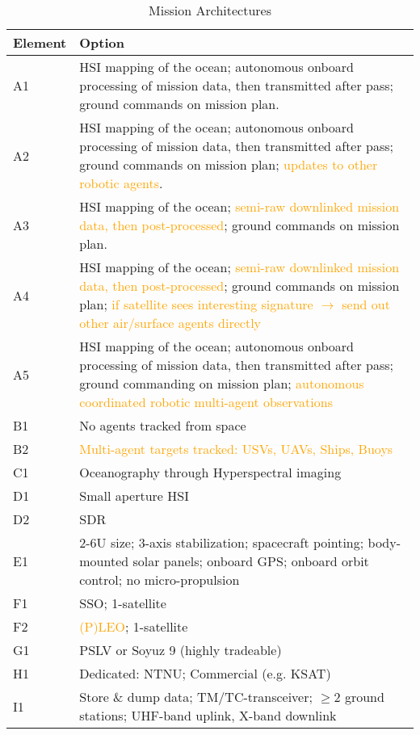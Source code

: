 \begin{table}[htbp]
	\caption{Mission Architectures}
	\label{tab:mission_elem_opts}
	\centering
		\begin{tabular}{|p{0.8cm}|p{7cm}|}
			\hline
		\textbf{Element}		&		\textbf{Option}			\\ 
			\hline 															  
			A1 &  HSI mapping of the ocean; autonomous onboard processing of mission data, then transmitted after pass; ground commands on mission plan.  \\
			\hline
			A2 & HSI mapping of the ocean; autonomous onboard processing of mission data, then transmitted after pass; ground commands on mission plan; \textcolor{orange}{updates to other robotic agents}. \\
			\hline
			A3  & HSI mapping of the ocean; \textcolor{orange}{semi-raw downlinked mission data, then post-processed}; ground commands on mission plan.  \\
			\hline
			A4  & HSI mapping of the ocean; \textcolor{orange}{semi-raw downlinked mission data, then post-processed}; ground commands on mission plan; \textcolor{orange}{if satellite sees interesting signature $\rightarrow$ send out other air/surface agents directly}  \\
			\hline	
			A5  & HSI mapping of the ocean; autonomous onboard processing of mission data, then transmitted after pass; ground commanding on mission plan; \textcolor{orange}{autonomous coordinated robotic multi-agent observations}   \\ \hline
			B1 & No agents tracked from space  \\ \hline
			B2  & \textcolor{orange}{Multi-agent targets tracked: USVs, UAVs, Ships, Buoys} \\ \hline
			C1  & Oceanography through Hyperspectral imaging    \\ \hline	
			D1  & Small aperture HSI \\ \hline
			D2  & SDR \\ \hline
			E1 & 2-6U size; 3-axis stabilization; spacecraft pointing; body-mounted solar panels; onboard GPS; onboard orbit control; no micro-propulsion \\ \hline
			F1 & SSO; 1-satellite \\ \hline
			F2 & \textcolor{orange}{(P)LEO}; 1-satellite \\ \hline
			G1 & PSLV or Soyuz 9 (highly tradeable) \\ \hline
			H1 & Dedicated: NTNU; Commercial (e.g. KSAT) \\ \hline
			I1 & Store \& dump data; TM/TC-transceiver; $\geq$2 ground stations; UHF-band uplink, X-band downlink \\ \hline

\end{tabular}
\end{table}
